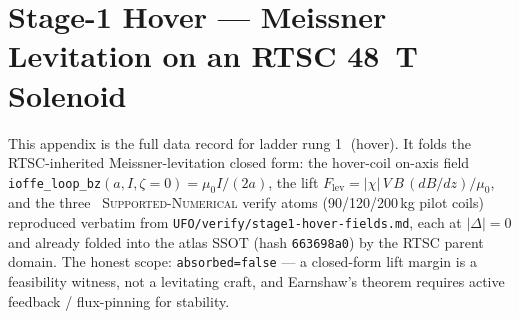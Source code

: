 \section{Stage-1 Hover --- Meissner Levitation on an RTSC \SI{48}{\tesla} Solenoid}
\label{app:stage1}

This appendix is the full data record for ladder rung
\textcircled{\scriptsize 1} (hover). It folds the RTSC-inherited
Meissner-levitation closed form: the hover-coil on-axis field
\verb|ioffe_loop_bz|$(a,I,\zeta\!=\!0)=\mu_0 I/(2a)$, the lift
$F_{\text{lev}}=|\chi|\,V\,B\,(dB/dz)/\mu_0$, and the three \tierGreen\
\textsc{Supported-Numerical} verify atoms (90/120/200\,kg pilot coils)
reproduced verbatim from \texttt{UFO/verify/stage1-hover-fields.md},
each at $|\Delta|=0$ and already folded into the atlas SSOT (hash
\texttt{663698a0}) by the RTSC parent domain. The honest scope:
\texttt{absorbed=false} --- a closed-form lift margin is a feasibility
witness, not a levitating craft, and Earnshaw's theorem
\citep{earnshaw1842} requires active feedback / flux-pinning for
stability.

